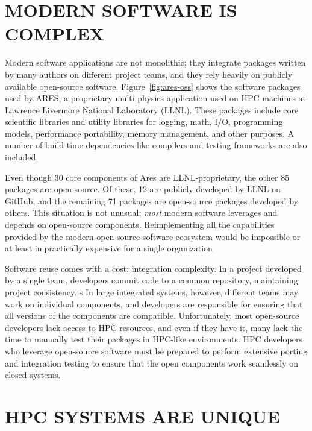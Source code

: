 \documentclass{IEEEcsmag}
\begin{document}
\section{MODERN SOFTWARE IS COMPLEX}

Modern software applications are not monolithic; they integrate packages written by many
authors on different project teams, and they rely heavily on publicly available open-source software. Figure~\ref{fig:ares-oss} shows the software packages used by ARES, a
proprietary multi-physics application used on HPC machines at Lawrence Livermore
National Laboratory (LLNL). These packages include core scientific libraries and
utility libraries for logging, math, I/O, programming models, performance portability,
memory management, and other purposes. A number of build-time
dependencies like compilers and testing frameworks are also included.

Even though 30 core components of Ares are LLNL-proprietary, the other 85 packages are
open source. Of these, 12 are publicly developed by LLNL on GitHub, and the remaining 71
packages are open-source packages developed by others. This situation is not unusual;
{\it most} modern software leverages and depends on open-source components. 
Reimplementing all the capabilities provided by the modern open-source-software ecosystem would be impossible or at least impractically expensive for a single organization

Software reuse comes with a cost: integration complexity.
In a project developed by a single team, developers commit code to a common repository, maintaining project consistency. s
In large integrated systems, however, different teams may work on individual components, and developers are responsible for ensuring that all versions of the components are compatible.
Unfortunately, most open-source developers lack access to HPC resources, and even if they have it, many lack the time to manually test their packages in HPC-like environments. HPC developers who leverage open-source software must be prepared to perform extensive porting and integration testing to ensure that the open components work seamlessly on closed systems.


\section{HPC SYSTEMS ARE UNIQUE}
\end{document}
